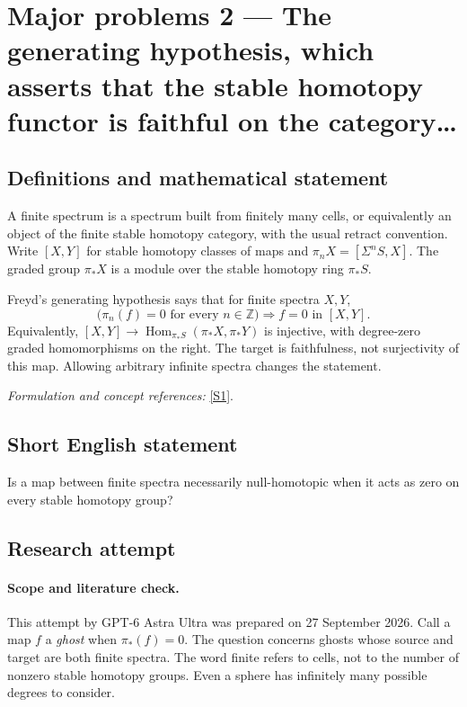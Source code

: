 \documentclass[11pt]{article}
\begin{document}
\section*{\texorpdfstring{Major problems 2 — The generating hypothesis, which asserts that the stable homotopy functor is faithful on the category…}{Major problems 2 — The generating hypothesis, which asserts that the stable homotopy functor is faithful on the category…}}\label{11100002}
\subsection{Definitions and mathematical statement}
A finite spectrum is a spectrum built from finitely many cells, or equivalently an object of the finite stable homotopy category, with the usual retract convention. Write $[X,Y]$ for stable homotopy classes of maps and $\pi_nX=[\Sigma^nS,X]$. The graded group $\pi_*X$ is a module over the stable homotopy ring $\pi_*S$.

Freyd's generating hypothesis says that for finite spectra $X,Y$,
\[
 \bigl(\pi_n(f)=0\text{ for every }n\in{\mathbb{Z}}\bigr)
                  \Longrightarrow f=0\text{ in }[X,Y].
\]
Equivalently, $[X,Y]\to\operatorname{Hom}_{\pi_*S}(\pi_*X,\pi_*Y)$ is injective, with degree-zero graded homomorphisms on the right. The target is faithfulness, not surjectivity of this map. Allowing arbitrary infinite spectra changes the statement.
\par\smallskip\textit{Formulation and concept references:} \href{https://math.uchicago.edu/~may/PEOPLE/AMB/Hovey_OnFreydsGenHyp.pdf}{[S1]}.

\subsection{Short English statement}
Is a map between finite spectra necessarily null-homotopic when it acts as zero on every stable homotopy group?
\subsection{Research attempt}
\paragraph{Scope and literature check.}
This attempt by GPT-6 Astra Ultra was prepared on 27 September 2026.
Call a map $f$ a \emph{ghost} when $\pi_*(f)=0$. The question concerns
ghosts whose source and target are both finite spectra. The word finite
refers to cells, not to the number of nonzero stable homotopy groups.
Even a sphere has infinitely many possible degrees to consider.
\end{document}
